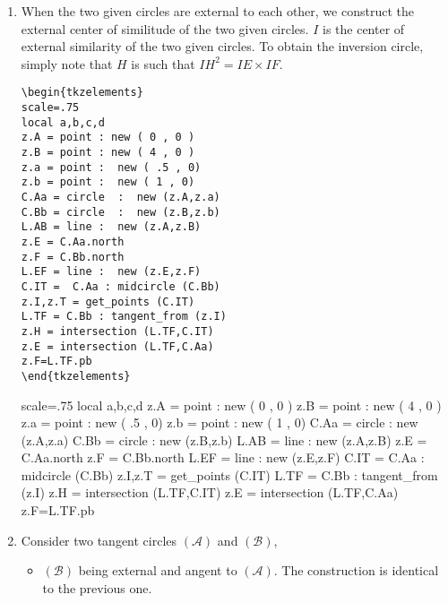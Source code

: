 \begin{enumerate}[label=(\roman*)]
\item When the two given circles are external to each other,  we  construct  the external center of similitude of the two given circles.
$I$ is the center of external similarity of the two given circles. To obtain the inversion circle, simply note that $H$ is such that $IH^2= IE\times IF$. \label{tangent_from}

\begin{minipage}{.4\textwidth}
\begin{Verbatim}
\begin{tkzelements}
scale=.75
local a,b,c,d
z.A = point : new ( 0 , 0 )
z.B = point : new ( 4 , 0 )
z.a = point :  new ( .5 , 0)
z.b = point :  new ( 1 , 0)
C.Aa = circle  :  new (z.A,z.a)
C.Bb = circle  :  new (z.B,z.b)
L.AB = line :  new (z.A,z.B)
z.E = C.Aa.north
z.F = C.Bb.north
L.EF = line :  new (z.E,z.F)
C.IT =  C.Aa : midcircle (C.Bb)
z.I,z.T = get_points (C.IT) 
L.TF = C.Bb : tangent_from (z.I)
z.H = intersection (L.TF,C.IT)
z.E = intersection (L.TF,C.Aa)
z.F=L.TF.pb
\end{tkzelements}
\end{Verbatim}
\end{minipage}
\begin{minipage}{.6\textwidth}
\begin{tkzelements}
scale=.75
local a,b,c,d
z.A = point : new ( 0 , 0 )
z.B = point : new ( 4 , 0 )
z.a = point :  new ( .5 , 0)
z.b = point :  new ( 1 , 0)
C.Aa = circle  :  new (z.A,z.a)
C.Bb = circle  :  new (z.B,z.b)
L.AB = line :  new (z.A,z.B)
z.E = C.Aa.north
z.F = C.Bb.north
L.EF = line :  new (z.E,z.F)
C.IT =  C.Aa : midcircle (C.Bb)
z.I,z.T = get_points (C.IT) 
L.TF = C.Bb : tangent_from (z.I)
z.H = intersection (L.TF,C.IT)
z.E = intersection (L.TF,C.Aa)
z.F=L.TF.pb
\end{tkzelements}
\end{minipage}


\item Consider two tangent circles $(\mathcal{A})$ and $(\mathcal{B})$,
\begin{itemize}

\item $(\mathcal{B})$ being external and angent to $(\mathcal{A})$. The construction is identical to the previous one.


\end{itemize}
\end{enumerate}

